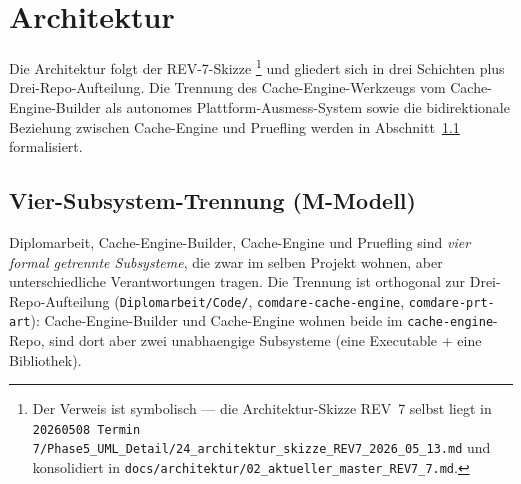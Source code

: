 \chapter{Architektur}\label{ch:architektur}


Die Architektur folgt der REV-7-Skizze \cite{leis2013art}\footnote{
Der Verweis ist symbolisch --- die Architektur-Skizze REV~7 selbst liegt in
\texttt{20260508 Termin 7/Phase5\_UML\_Detail/24\_architektur\_skizze\_REV7\_2026\_05\_13.md}
und konsolidiert in \texttt{docs/architektur/02\_aktueller\_master\_REV7\_7.md}.}
und gliedert sich in drei Schichten plus Drei-Repo-Aufteilung.
Die Trennung des Cache-Engine-Werkzeugs vom Cache-Engine-Builder als
autonomes Plattform-Ausmess-System sowie die bidirektionale
Beziehung zwischen Cache-Engine und Pruefling werden in
Abschnitt~\ref{sec:vier-subsysteme} formalisiert.

\section{Vier-Subsystem-Trennung (M-Modell)}\label{sec:vier-subsysteme}


Diplomarbeit, Cache-Engine-Builder, Cache-Engine und Pruefling sind
\emph{vier formal getrennte Subsysteme}, die zwar im selben Projekt
wohnen, aber unterschiedliche Verantwortungen tragen. Die Trennung
ist orthogonal zur Drei-Repo-Aufteilung
(\texttt{Diplomarbeit/Code/}, \texttt{comdare-cache-engine},
\texttt{comdare-prt-art}): Cache-Engine-Builder und Cache-Engine
wohnen beide im \texttt{cache-engine}-Repo, sind dort aber zwei
unabhaengige Subsysteme (eine Executable + eine Bibliothek).


